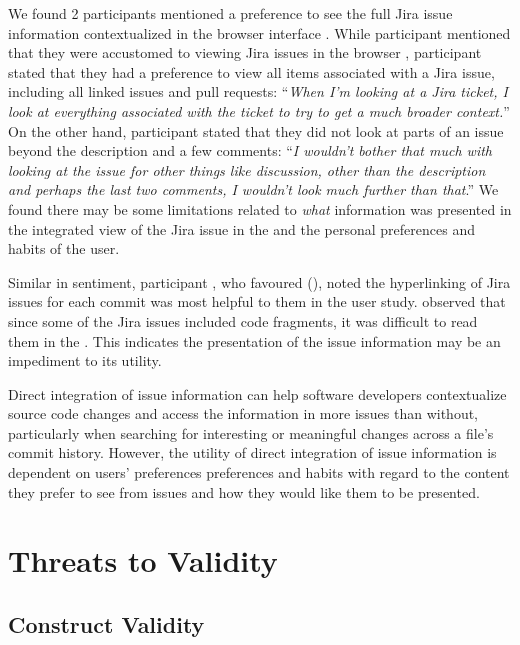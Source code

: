 We found 2 participants mentioned a preference to see the full Jira issue information contextualized in the browser interface .
While participant  mentioned that they were accustomed to viewing Jira issues in the browser ,
participant  stated that they had a preference to view all items associated with a Jira issue, including all linked issues and pull requests:
``\textit{When I’m looking at a Jira ticket, I look at everything associated with the ticket to try to get a much broader context.}''
On the other hand,
participant  stated that they did not look at parts of an issue beyond the description and a few comments:
``\textit{I wouldn’t bother that much with looking at the issue for other things like discussion, other than the description and perhaps the last two comments, 
I wouldn’t look much further than that}.''
We found there may be some limitations related to \emph{what} information was presented in the integrated view of the Jira issue in the 
and the personal preferences and habits of the user.

Similar in sentiment, participant , who favoured (), noted the hyperlinking of Jira issues for each commit
was most helpful to them in the user study.
 observed that since some of the Jira issues included code fragments, it was difficult to read them in the .
This indicates the presentation of the issue information may be an impediment to its utility.

\begin{summary}[RQ3]
  Direct integration of issue information can help software developers contextualize source code changes 
  and access the information in more issues than without,
  particularly when searching for interesting or meaningful changes across a file's commit history.
  However, the utility of direct integration of issue information is dependent on users' preferences preferences and habits 
  with regard to the content they prefer to see from issues and how they would like them to be presented.
\end{summary}


\section{Threats to Validity}

\subsection{Construct Validity}

